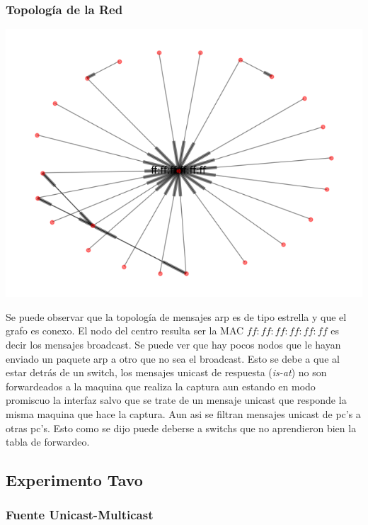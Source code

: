 \clearpage
\subsubsection{Topolog\'ia de la Red}
\begin{center}
 \includegraphics[scale=0.6]{../plots/trabajo_s2_topologia.png}
\end{center}

Se puede observar que la topología de mensajes arp es de tipo estrella
y que el grafo es conexo. El nodo del centro resulta ser la MAC $ff:ff:ff:ff:ff:ff$
es decir los mensajes broadcast. Se puede ver que hay pocos nodos que le hayan
enviado un paquete arp a otro que no sea el broadcast. Esto se debe
a que al estar detrás de un switch, los mensajes unicast de respuesta (\textit{is-at})
no son forwardeados a la maquina que realiza la captura aun estando en modo promiscuo
la interfaz salvo que se trate de un mensaje unicast que responde la misma maquina que
hace la captura. Aun asi se filtran mensajes unicast de pc's a otras pc's. Esto como
se dijo puede deberse a switchs que no aprendieron bien la tabla de forwardeo.

\subsection{Experimento Tavo}

\subsubsection{Fuente Unicast-Multicast}

